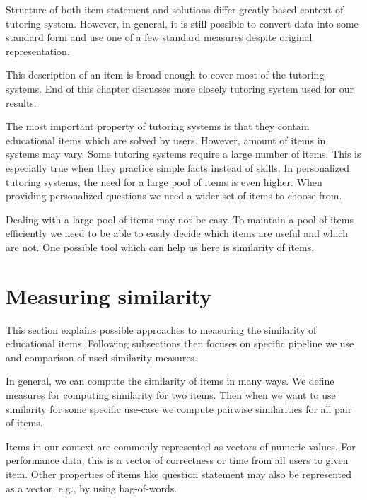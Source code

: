 \documentclass[
  digital, %
  table,   %
  nolof,     %
  nolot,     %
  nocover,
  color,
  final, %
]{fithesis3}
\begin{document}
Structure of both item statement and solutions differ greatly based context of tutoring system. However, in general, it is still possible to convert data into some standard form and use one of a few standard measures despite original representation.

This description of an item is broad enough to cover most of the tutoring systems. End of this chapter discusses more closely tutoring system used for our results.


The most important property of tutoring systems is that they contain educational items which are solved by users. However, amount of items in systems may vary. Some tutoring systems require a large number of items. This is especially true when they practice simple facts instead of skills. In personalized tutoring systems, the need for a large pool of items is even higher. When providing personalized questions we need a wider set of items to choose from.


Dealing with a large pool of items may not be easy. To maintain a pool of items efficiently we need to be able to easily decide which items are useful and which are not. One possible tool which can help us here is similarity of items.


\section{Measuring similarity}\label{measuring-similarity}

This section explains possible approaches to measuring the similarity of educational items. Following subsections then focuses on specific pipeline we use and comparison of used similarity measures.


In general, we can compute the similarity of items in many ways. We define measures for computing similarity for two items. Then when we want to use similarity for some specific use-case we compute pairwise similarities for all pair of items.

Items in our context are commonly represented as vectors of numeric values. For performance data, this is a vector of correctness or time from all users to given item. Other properties of items like question statement may also be represented as a vector, e.g., by using bag-of-words.
\end{document}
